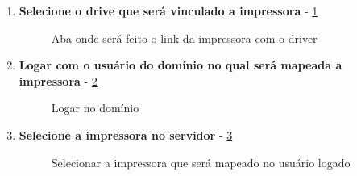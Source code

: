 \begin{enumerate}
	\item \textbf{Selecione o drive que será vinculado a impressora} - \ref{aba_avancado}
	\begin{figure}[ht]
	   	\centering
	   	\caption{Aba onde será feito o link da impressora com o driver}
	    \label{aba_avancado}
	\end{figure}
	
		\pagebreak
		
	\item \textbf{Logar com o usuário do domínio no qual será mapeada a impressora} - \ref{login_dominio}
	\begin{figure}[ht]
	   	\centering
	   	\caption{Logar no domínio}
	    \label{login_dominio}
	\end{figure}
	
	
	\item \textbf{Selecione a impressora no servidor} - \ref{selecionar_impressora_servidor}
	\begin{figure}[ht]
	   	\centering
	   	\caption{Selecionar a impressora que será mapeado no usuário logado}
	    \label{selecionar_impressora_servidor}
	\end{figure}
	

\end{enumerate}
